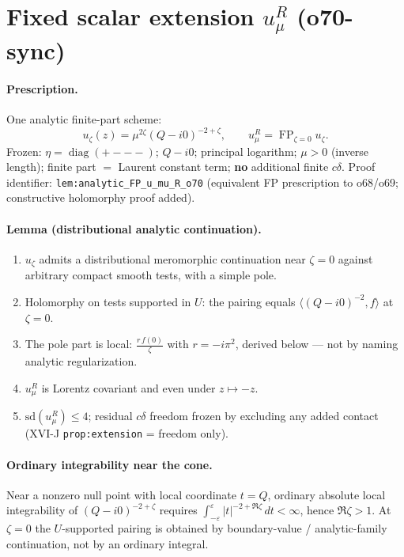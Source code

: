 \section{Fixed scalar extension \(u_\mu^R\) (o70-sync)}
\label{sec:O-scalar-ext}

\paragraph{Prescription.} One analytic finite-part scheme:
\[
u_\zeta(z)=\mu^{2\zeta}(Q-i0)^{-2+\zeta},\qquad
u_\mu^R=\operatorname{FP}_{\zeta=0}u_\zeta.
\]
Frozen: \(\eta=\operatorname{diag}(+---)\); \(Q-i0\); principal logarithm;
\(\mu>0\) (inverse length); finite part $=$ Laurent constant term;
\textbf{no} additional finite \(c\delta\).
Proof identifier: \texttt{lem:analytic\_FP\_u\_mu\_R\_o70}
(equivalent FP prescription to o68/o69; constructive holomorphy proof added).

\paragraph{Lemma (distributional analytic continuation).}
\begin{enumerate}
\item \(u_\zeta\) admits a distributional meromorphic continuation near \(\zeta=0\)
against arbitrary compact smooth tests, with a simple pole.
\item Holomorphy on tests supported in \(U\): the pairing equals
\(\langle(Q-i0)^{-2},f\rangle\) at \(\zeta=0\).
\item The pole part is local: \(\displaystyle\frac{r\,f(0)}{\zeta}\) with
\(r=-i\pi^2\), derived below --- not by naming analytic regularization.
\item \(u_\mu^R\) is Lorentz covariant and even under \(z\mapsto-z\).
\item \(\mathrm{sd}(u_\mu^R)\le4\); residual \(c\delta\) freedom frozen by
excluding any added contact (XVI-J \texttt{prop:extension} = freedom only).
\end{enumerate}

\paragraph{Ordinary integrability near the cone.}
Near a nonzero null point with local coordinate \(t=Q\), ordinary absolute
local integrability of \((Q-i0)^{-2+\zeta}\) requires
\(\int_{-\varepsilon}^{\varepsilon}|t|^{-2+\Re\zeta}\,dt<\infty\), hence
\(\Re\zeta>1\). At \(\zeta=0\) the \(U\)-supported pairing is obtained by
boundary-value / analytic-family continuation, not by an ordinary integral.

